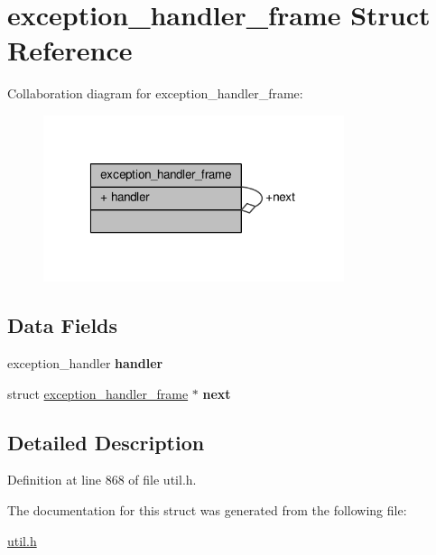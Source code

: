 \hypertarget{structexception__handler__frame}{\section{exception\-\_\-handler\-\_\-frame Struct Reference}
\label{structexception__handler__frame}
}


Collaboration diagram for exception\-\_\-handler\-\_\-frame\-:
\nopagebreak
\begin{figure}[H]
\begin{center}
\leavevmode
\includegraphics[width=250pt]{structexception__handler__frame__coll__graph}
\end{center}
\end{figure}
\subsection*{Data Fields}
\begin{DoxyCompactItemize}
\item 
\hypertarget{structexception__handler__frame_a9df815cc8cec8aace242043b89fb44e8}{exception\-\_\-handler {\bfseries handler}}\label{structexception__handler__frame_a9df815cc8cec8aace242043b89fb44e8}

\item 
\hypertarget{structexception__handler__frame_a407cf31d00d01b49b1774dea464c29cf}{struct \hyperlink{structexception__handler__frame}{exception\-\_\-handler\-\_\-frame} $\ast$ {\bfseries next}}\label{structexception__handler__frame_a407cf31d00d01b49b1774dea464c29cf}

\end{DoxyCompactItemize}


\subsection{Detailed Description}


Definition at line 868 of file util.\-h.



The documentation for this struct was generated from the following file\-:\begin{DoxyCompactItemize}
\item 
\hyperlink{util_8h}{util.\-h}\end{DoxyCompactItemize}
